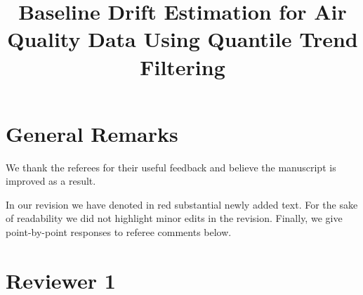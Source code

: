 \documentclass{article}
\newcommand{\Note}[1]{{{\color{red}{#1}}}}
\begin{document}
\title{Baseline Drift Estimation for Air Quality Data Using Quantile Trend Filtering}
\author{}
\date{}
\maketitle

\section*{General Remarks}

We thank the referees for their useful feedback and believe the manuscript is improved as a result. 

In our revision we have denoted in \color{red}red \color{black} substantial newly added text. For the sake of readability we did not highlight minor edits in the revision.
Finally, we give point-by-point responses to referee comments below.
%


%


\section*{Reviewer 1}
\end{document}
